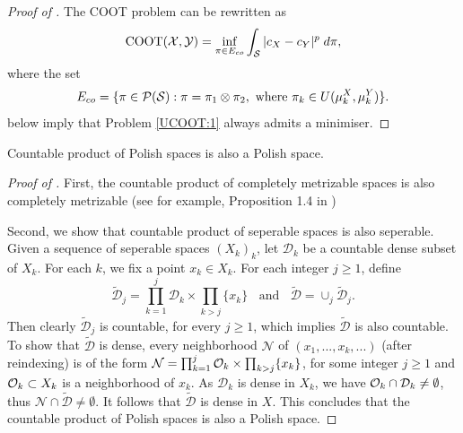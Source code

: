 \begin{proof}[Proof of ]
  The COOT problem can be rewritten as
  \begin{equation} \label{UCOOT:1}
    \text{COOT}(\mathcal X, \mathcal Y) = \inf_{\pi \in E_{co}} \int_{\mathcal S} \vert c_X - c_Y \vert^p \; d\pi,
  \end{equation}
  where the set
  \begin{equation}
    E_{co} = \{ \pi \in \mathcal P(\mathcal S): \pi = \pi_1 \otimes \pi_2,
    \text{ where } \pi_k \in U(\mu_k^X, \mu_k^Y) \}.
  \end{equation}
  below imply that Problem \eqref{UCOOT:1} always admits a minimiser.
\end{proof}
\begin{lemma} \label{lemma:product_polish}
  Countable product of Polish spaces is also a Polish space.
\end{lemma}
\begin{proof}[Proof of ]
  First, the countable product of completely metrizable spaces is also completely metrizable
  (see for example, Proposition 1.4 in \citep{Dominique20})

  Second, we show that countable product of seperable spaces is also seperable.
  Given a sequence of seperable spaces $(X_k)_k$,
  let $\mathcal D_k$ be a countable dense subset of $X_k$. For each $k$,
  we fix a point $x_k \in X_k$. For each integer $j \geq 1$, define
  \begin{equation}
    \widetilde{\mathcal D}_j = \prod_{k=1}^j \mathcal D_k \times \prod_{k > j} \{ x_k \}
    \;\; \text{ and } \;\;
    \widetilde{\mathcal D} = \cup_{j} \widetilde{\mathcal D}_j.
  \end{equation}
  Then clearly $\widetilde{\mathcal D}_j$ is countable, for every $j \geq 1$,
  which implies $\widetilde{\mathcal D}$ is also countable.
  To show that $\widetilde{\mathcal D}$ is dense, every neighborhood $\mathcal N$ of
  $(x_1, ..., x_k, ...)$ (after reindexing) is of the form
  $\mathcal N = \prod_{k=1}^j \mathcal O_k \times \prod_{k > j} \{ x_k \}$,
  for some integer $j \geq 1$ and $\mathcal O_k \subset X_k$ is a neighborhood of $x_k$.
  As $\mathcal D_k$ is dense in $X_k$, we have $\mathcal O_k \cap \mathcal D_k \neq \emptyset$,
  thus $\mathcal N \cap \widetilde{\mathcal D} \neq \emptyset$.
  It follows that $\widetilde{\mathcal D}$ is dense in $X$.
  This concludes that the countable product of Polish spaces is also a Polish space.
\end{proof}
